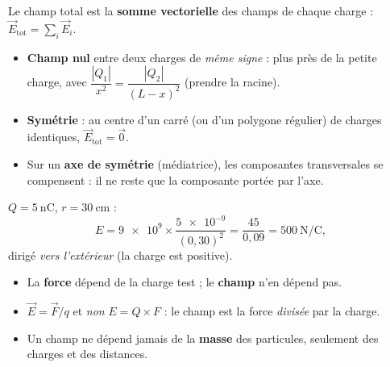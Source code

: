 \documentclass[11pt,a4paper]{article}
\newcommand{\vv}[1]{\vec{#1}}\newcommand{\ds}{\displaystyle}
\begin{document}
\begin{methode}
Le champ total est la \textbf{somme vectorielle} des champs de chaque charge : $\vv{E}_{\text{tot}} =
\sum_i \vv{E}_i$.
\begin{itemize}[leftmargin=1.5em,topsep=1pt,itemsep=1pt]
  \item \textbf{Champ nul} entre deux charges de \emph{même signe} : plus près de la petite charge,
        avec $\dfrac{|Q_1|}{x^2} = \dfrac{|Q_2|}{(L-x)^2}$ (prendre la racine).
  \item \textbf{Symétrie} : au centre d'un carré (ou d'un polygone régulier) de charges identiques,
        $\vv{E}_{\text{tot}} = \vv{0}$.
  \item Sur un \textbf{axe de symétrie} (médiatrice), les composantes transversales se compensent :
        il ne reste que la composante portée par l'axe.
\end{itemize}
\end{methode}

\begin{exemplebox}
$Q = \SI{+5}{\nano\coulomb}$, $r = \SI{30}{\centi\metre}$ :
\[ E = \num{9e9}\times\frac{\num{5e-9}}{(0{,}30)^2} = \frac{45}{0{,}09} = \SI{500}{\newton\per\coulomb}, \]
dirigé \emph{vers l'extérieur} (la charge est positive).
\end{exemplebox}

\begin{piege}
\begin{itemize}[leftmargin=1.5em,topsep=1pt,itemsep=1pt]
  \item La \textbf{force} dépend de la charge test ; le \textbf{champ} n'en dépend pas.
  \item $\vv{E} = \vv{F}/q$ et \emph{non} $E = Q\times F$ : le champ est la force \emph{divisée} par
        la charge.
  \item Un champ ne dépend jamais de la \textbf{masse} des particules, seulement des charges et des
        distances.
\end{itemize}
\end{piege}
\end{document}

